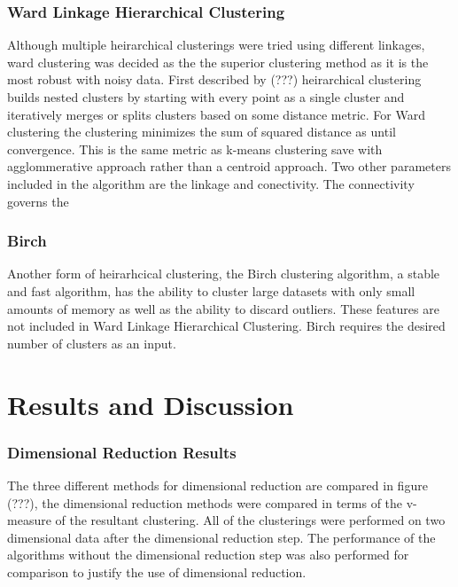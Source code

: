 \documentclass[journal, a4paper]{IEEEtran}
\begin{document}
\subsubsection{Ward Linkage Hierarchical Clustering}

Although multiple heirarchical clusterings were tried using different linkages, ward clustering was decided as the the superior clustering method as it is the most robust with noisy data. First described by (???) heirarchical clustering builds nested clusters by starting with every point as a single cluster and iteratively merges or splits clusters based on some distance metric. For Ward clustering the clustering minimizes the sum of squared distance as until convergence. This is the same metric as k-means clustering save with agglommerative approach rather than a centroid approach. Two other parameters included in the algorithm are the linkage and conectivity. The connectivity governs the 

\subsubsection{Birch}

Another form of heirarhcical clustering, the Birch clustering algorithm, a stable and fast algorithm, has the ability to cluster large datasets with only small amounts of memory as well as the ability to discard outliers. These features are not included in Ward Linkage Hierarchical Clustering. Birch requires the desired number of clusters as an input.


\section{Results and Discussion}

\subsubsection{Dimensional Reduction Results}

The three different methods for dimensional reduction are compared in figure (???), the dimensional reduction methods were compared in terms of the v-measure of the resultant clustering. All of the clusterings were performed on two dimensional data after the dimensional reduction step. The performance of the algorithms without the dimensional reduction step was also performed for comparison to justify the use of dimensional reduction.
\end{document}
